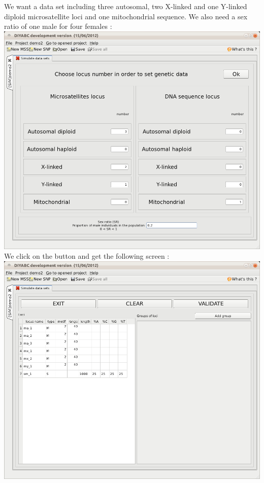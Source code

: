 We want a data set including three autosomal, two X-linked and one Y-linked diploid microsatellite loci and one mitochondrial sequence. We also need a sex ratio of one male for four females :\\

\includegraphics[scale=0.33]{gui_pictures/Capture-DIYABC-72.png} \\

We click on the  button and get the following screen :\\

\includegraphics[scale=0.33]{gui_pictures/Capture-DIYABC-73.png} \\

